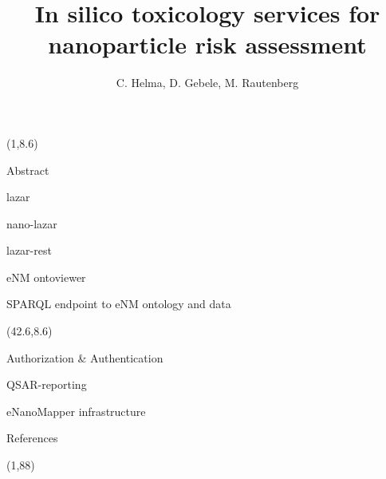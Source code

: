 \documentclass[final]{beamer}
\title{In silico toxicology services for nanoparticle risk assessment}
\author{C. Helma, D. Gebele, M. Rautenberg}
\institute{\emph{in silico} toxicology gmbh, Basel, Switzerland}
\begin{document}
  \begin{frame}{}

    \begin{textblock}{40.5}(1,8.6)
      \begin{block}{Abstract}
        
      \end{block}

      \begin{block}{lazar}
        
      \end{block}

      \begin{block}{nano-lazar}
        
      \end{block}

      \begin{block}{lazar-rest}
        
      \end{block}

      \begin{block}{eNM ontoviewer}
        
      \end{block}

      \begin{block}{SPARQL endpoint to eNM ontology and data}
        
      \end{block}


    \end{textblock}

    \begin{textblock}{40.5}(42.6,8.6)

      \begin{block}{Authorization \& Authentication}
        
      \end{block}

      \begin{block}{QSAR-reporting}
        
      \end{block}

      \begin{block}{eNanoMapper infrastructure}
        
      \end{block}



      \begin{block}{References}
        \small
      \end{block}

    \end{textblock}

    \begin{textblock}{82.1}(1,88)
      
    \end{textblock}

  \end{frame}
\end{document}
